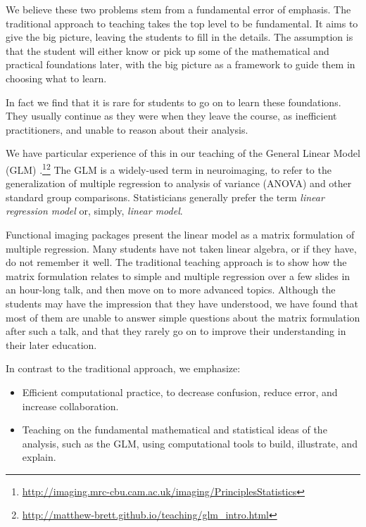 We believe these two problems stem from a fundamental error of emphasis.
The traditional approach to teaching takes the top level to be fundamental.
It aims to give the big picture, leaving the students to fill in the details.
The assumption is that the student will either know or pick up some of the
mathematical and practical foundations later, with the big picture as a
framework to guide them in choosing what to learn.

In fact we find that it is rare for students to go on to learn these
foundations. They usually continue as they were when they leave the course, as
inefficient practitioners, and unable to reason about their analysis.

We have particular experience of this in our teaching of the General Linear
Model (GLM)
\citep{poline2012general}.\footnote{\url{http://imaging.mrc-cbu.cam.ac.uk/imaging/PrinciplesStatistics}}\footnote{\url{http://matthew-brett.github.io/teaching/glm_intro.html}\label{glm_intro}}
The GLM is a widely-used term in neuroimaging, to refer to the generalization
of multiple regression to analysis of variance (ANOVA) and other standard
group comparisons.  Statisticians generally prefer the term \emph{linear
regression model} or, simply, \emph{linear model}.

Functional imaging packages present the linear model as a matrix formulation
of multiple regression.  Many students have not taken linear algebra, or if
they have, do not remember it well.  The traditional teaching approach is to
show how the matrix formulation relates to simple and multiple regression over
a few slides in an hour-long talk, and then move on to more advanced topics.
Although the students may have the impression that they have understood, we
have found that most of them are unable to answer simple questions about the
matrix formulation after such a talk, and that they rarely go on to improve
their understanding in their later education.


In contrast to the traditional approach, we emphasize:

\begin{itemize}

\item
    Efficient computational practice, to decrease confusion, reduce error, and
        increase collaboration.

\item
    Teaching on the fundamental mathematical and statistical ideas of the
        analysis, such as the GLM, using computational tools to build,
        illustrate, and explain.

\end{itemize}

